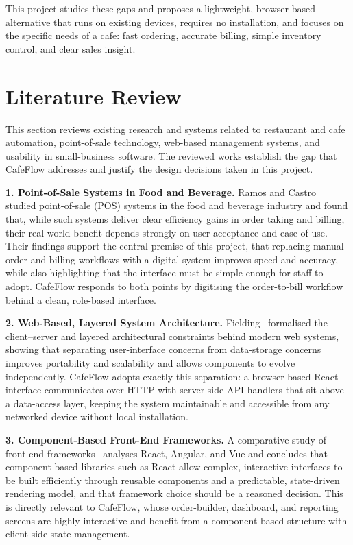 \documentclass[12pt,a4paper]{report}
\begin{document}
This project studies these gaps and proposes a lightweight, browser-based alternative that runs
on existing devices, requires no installation, and focuses on the specific needs of a cafe:
fast ordering, accurate billing, simple inventory control, and clear sales insight.

\section{Literature Review}
This section reviews existing research and systems related to restaurant and cafe automation,
point-of-sale technology, web-based management systems, and usability in small-business
software. The reviewed works establish the gap that CafeFlow addresses and justify the design
decisions taken in this project.

\textbf{1. Point-of-Sale Systems in Food and Beverage.}
Ramos and Castro~\cite{lit_pos} studied point-of-sale (POS) systems in the food and beverage
industry and found that, while such systems deliver clear efficiency gains in order taking and
billing, their real-world benefit depends strongly on user acceptance and ease of use. Their
findings support the central premise of this project, that replacing manual order and billing
workflows with a digital system improves speed and accuracy, while also highlighting that the
interface must be simple enough for staff to adopt. CafeFlow responds to both points by
digitising the order-to-bill workflow behind a clean, role-based interface.

\textbf{2. Web-Based, Layered System Architecture.}
Fielding~\cite{lit_web} formalised the client--server and layered architectural constraints
behind modern web systems, showing that separating user-interface concerns from data-storage
concerns improves portability and scalability and allows components to evolve independently.
CafeFlow adopts exactly this separation: a browser-based React interface communicates over HTTP
with server-side API handlers that sit above a data-access layer, keeping the system
maintainable and accessible from any networked device without local installation.

\textbf{3. Component-Based Front-End Frameworks.}
A comparative study of front-end frameworks~\cite{lit_react} analyses React, Angular, and Vue and
concludes that component-based libraries such as React allow complex, interactive interfaces to
be built efficiently through reusable components and a predictable, state-driven rendering model,
and that framework choice should be a reasoned decision. This is directly relevant to CafeFlow,
whose order-builder, dashboard, and reporting screens are highly interactive and benefit from a
component-based structure with client-side state management.
\end{document}
